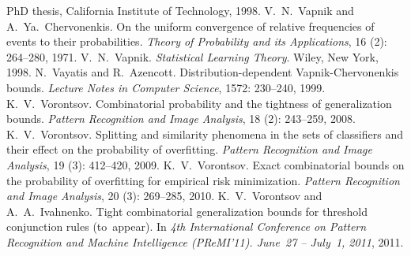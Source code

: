 \documentclass{article}
\renewcommand{\emph}[1]{\textit{#1}}
\begin{document}
\begin{thebibliography}{27}
    \newblock PhD thesis, California Institute of Technology, 1998.
    V.~N.~Vapnik and A.~Ya.~Chervonenkis.
    \newblock On the uniform convergence of relative frequencies of events to their probabilities.
    \newblock \emph{Theory of Probability and its Applications}, 16 (2): 264--280, 1971.
    V.~N.~Vapnik.
    \newblock \emph{Statistical Learning Theory}.
    \newblock Wiley, New York, 1998.
    N.~Vayatis and R.~Azencott.
    \newblock Distribution-dependent {Vapnik-Chervonenkis} bounds.
    \newblock \emph{Lecture Notes in Computer Science}, 1572: 230--240, 1999.
    K.~V.~Vorontsov.
    \newblock Combinatorial probability and the tightness of generalization bounds.
    \newblock \emph{Pattern Recognition and Image Analysis}, 18 (2): 243--259, 2008.
    K.~V.~Vorontsov.
    \newblock Splitting and similarity phenomena in the sets of classifiers and their effect on the probability of overfitting.
    \newblock \emph{Pattern Recognition and Image Analysis}, 19 (3): 412--420, 2009.
    K.~V.~Vorontsov.
    \newblock Exact combinatorial bounds on the probability of overfitting for empirical risk minimization.
    \newblock \emph{Pattern Recognition and Image Analysis}, 20 (3): 269--285, 2010.
    K.~V.~Vorontsov and A.~A.~Ivahnenko.
    \newblock Tight combinatorial generalization bounds for threshold conjunction rules (to~appear).
    \newblock In \emph{4th International Conference on Pattern Recognition and Machine Intelligence (PReMI'11).
    June~27 -- July~1, 2011}, 2011.
\end{thebibliography}
\end{document}
